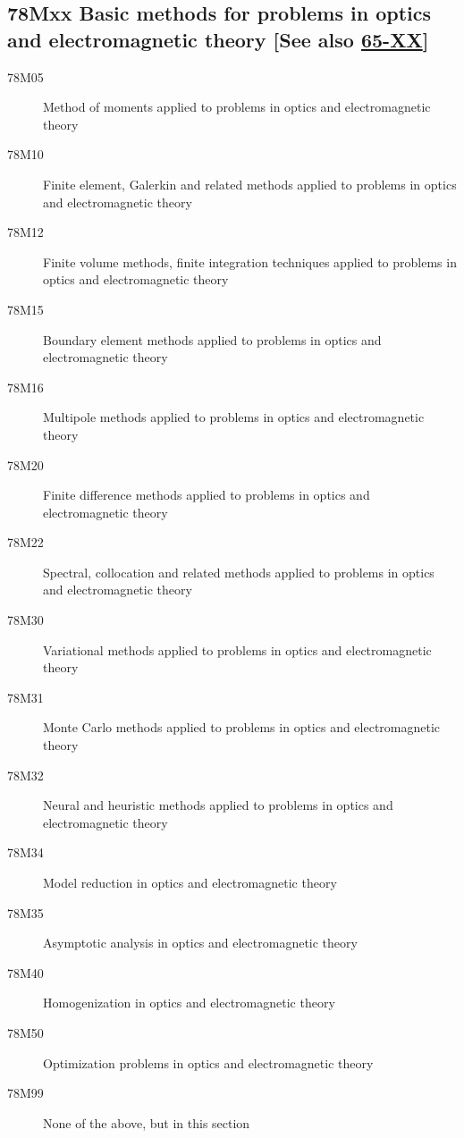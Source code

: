 \subsection*{78Mxx  Basic methods for problems in optics and electromagnetic theory [See also \hyperref[65-XX]{65-XX}] }\label{78Mxx}
\begin{description}  
\item [78M05]\label{78M05} Method of moments applied to problems in optics and electromagnetic theory
\item [78M10]\label{78M10} Finite element, Galerkin and related methods applied to problems in optics and electromagnetic theory
\item [78M12]\label{78M12} Finite volume methods, finite integration techniques applied to problems in optics and electromagnetic theory
\item [78M15]\label{78M15} Boundary element methods applied to problems in optics and electromagnetic theory
\item [78M16]\label{78M16} Multipole methods applied to problems in optics and electromagnetic theory
\item [78M20]\label{78M20} Finite difference methods applied to problems in optics and electromagnetic theory
\item [78M22]\label{78M22} Spectral, collocation and related methods applied to problems in optics and electromagnetic theory
\item [78M30]\label{78M30} Variational methods applied to problems in optics and electromagnetic theory
\item [78M31]\label{78M31} Monte Carlo methods applied to problems in optics and electromagnetic theory
\item [78M32]\label{78M32} Neural and heuristic methods applied to problems in optics and electromagnetic theory
\item [78M34]\label{78M34} Model reduction in optics and electromagnetic theory
\item [78M35]\label{78M35} Asymptotic analysis in optics and electromagnetic theory
\item [78M40]\label{78M40} Homogenization in optics and electromagnetic theory
\item [78M50]\label{78M50} Optimization problems in optics and electromagnetic theory
\item [78M99]\label{78M99} None of the above, but in this section
\end{description}
